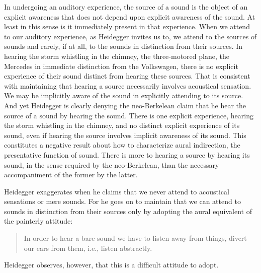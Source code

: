 In undergoing an auditory experience, the source of a sound is the object of an explicit awareness that does not depend upon explicit awareness of the sound. At least in this sense is it immediately present in that experience. When we attend to our auditory experience, as Heidegger invites us to, we attend to the sources of sounds and rarely, if at all, to the sounds in distinction from their sources. In hearing the storm whistling in the chimney, the three-motored plane, the Mercedes in immediate distinction from the Volkswagen, there is no explicit experience of their sound distinct from hearing these sources. That is consistent with maintaining that hearing a source necessarily involves acoustical sensation. We may be implicitly aware of the sound in explicitly attending to its source. And yet Heidegger is clearly denying the neo-Berkelean claim that he hear the source of a sound by hearing the sound. There is one explicit experience, hearing the storm whistling in the chimney, and no distinct explicit experience of its sound, even if hearing the source involves implicit awareness of its sound. This constitutes a negative result about how to characterize aural indirection, the presentative function of sound. There is more to hearing a source by hearing its sound, in the sense required by the neo-Berkelean, than the necessary accompaniment of the former by the latter.

Heidegger exaggerates when he claims that we never attend to acoustical sensations or mere sounds. For he goes on to maintain that we can attend to sounds in distinction from their sources only by adopting the aural equivalent of the painterly attitude:
\begin{quote}
    In order to hear a bare sound we have to listen away from things, divert our ears from them, i.e., listen abstractly. \citep[152]{Heidegger:1935uq}
\end{quote}
Heidegger observes, however, that this is a difficult attitude to adopt. 

